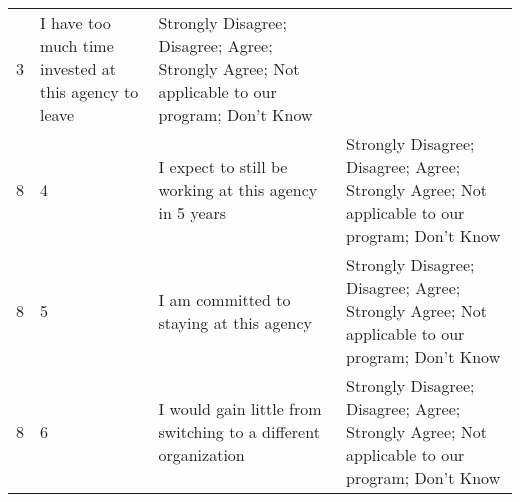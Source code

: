 \documentclass[]{article}
\begin{document}
\begin{longtable}[]{@{}llll@{}}
\begin{minipage}[t]{0.04\columnwidth}
3\strut
\end{minipage} & \begin{minipage}[t]{0.40\columnwidth}\raggedright\strut
I have too much time invested at this agency to leave\strut
\end{minipage} & \begin{minipage}[t]{0.40\columnwidth}\raggedright\strut
Strongly Disagree; Disagree; Agree; Strongly Agree; Not applicable to
our program; Don't Know\strut
\end{minipage}\tabularnewline
\begin{minipage}[t]{0.05\columnwidth}\raggedright\strut
8\strut
\end{minipage} & \begin{minipage}[t]{0.04\columnwidth}\raggedright\strut
4\strut
\end{minipage} & \begin{minipage}[t]{0.40\columnwidth}\raggedright\strut
I expect to still be working at this agency in 5 years\strut
\end{minipage} & \begin{minipage}[t]{0.40\columnwidth}\raggedright\strut
Strongly Disagree; Disagree; Agree; Strongly Agree; Not applicable to
our program; Don't Know\strut
\end{minipage}\tabularnewline
\begin{minipage}[t]{0.05\columnwidth}\raggedright\strut
8\strut
\end{minipage} & \begin{minipage}[t]{0.04\columnwidth}\raggedright\strut
5\strut
\end{minipage} & \begin{minipage}[t]{0.40\columnwidth}\raggedright\strut
I am committed to staying at this agency\strut
\end{minipage} & \begin{minipage}[t]{0.40\columnwidth}\raggedright\strut
Strongly Disagree; Disagree; Agree; Strongly Agree; Not applicable to
our program; Don't Know\strut
\end{minipage}\tabularnewline
\begin{minipage}[t]{0.05\columnwidth}\raggedright\strut
8\strut
\end{minipage} & \begin{minipage}[t]{0.04\columnwidth}\raggedright\strut
6\strut
\end{minipage} & \begin{minipage}[t]{0.40\columnwidth}\raggedright\strut
I would gain little from switching to a different organization\strut
\end{minipage} & \begin{minipage}[t]{0.40\columnwidth}\raggedright\strut
Strongly Disagree; Disagree; Agree; Strongly Agree; Not applicable to
our program; Don't Know\strut
\end{minipage}\tabularnewline
\bottomrule
\end{longtable}
\end{document}
